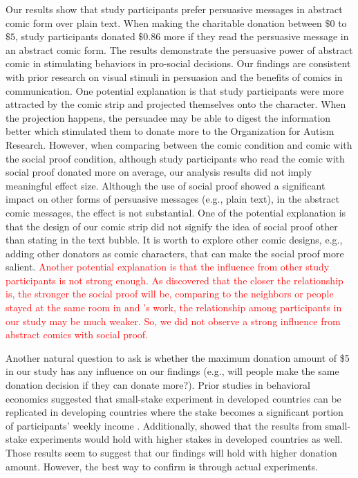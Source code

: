 Our results show that study participants prefer persuasive messages in abstract comic form over plain text. When making the charitable donation between $\$0$ to $\$5$, study participants donated $\$ 0.86$ more if they read the persuasive message in an abstract comic form. The results demonstrate the persuasive power of abstract comic in stimulating behaviors in pro-social decisions. Our findings are consistent with prior research on visual stimuli in persuasion and the benefits of comics in communication. One potential explanation is that study participants were more attracted by the comic strip and projected themselves onto the character. When the projection happens, the persuadee may be able to digest the information better which stimulated them to donate more to the Organization for Autism Research. However, when comparing between the comic condition and comic with the social proof condition, although study participants who read the comic with social proof donated more on average, our analysis results did not imply meaningful effect size. Although the use of social proof showed a significant impact on other forms of persuasive messages (e.g., plain text), in the abstract comic messages, the effect is not substantial. One of the potential explanation is that the design of our comic strip did not signify the idea of social proof other than stating in the text bubble. It is worth to explore other comic designs, e.g., adding other donators as comic characters, that can make the social proof more salient. \textcolor{red}{Another potential explanation is that the influence from other study participants is not strong enough. As \textcite{goldstein2008room} discovered that the closer the relationship is, the stronger the social proof will be, comparing to the neighbors or people stayed at the same room in \textcite{Cialdini2004} and \textcite{goldstein2008room}'s work, the relationship among participants in our study may be much weaker. So, we did not observe a strong influence from abstract comics with social proof.}

Another natural question to ask is whether the maximum donation amount of  \$5  in our study has any influence on our findings (e.g., will people make the same donation decision if they can donate more?).  Prior studies in behavioral economics suggested that small-stake experiment in developed countries can be replicated in developing countries where the stake becomes a significant portion of participants' weekly income \cite{binswanger1980attitudes,binswanger1981attitudes,kachelmeier1992examining}. Additionally, \textcite{post2008deal} showed that the results from small-stake experiments would hold with higher stakes in developed countries as well. Those results seem to suggest that our findings will hold with higher donation amount. However, the best way to confirm is through actual experiments. 

